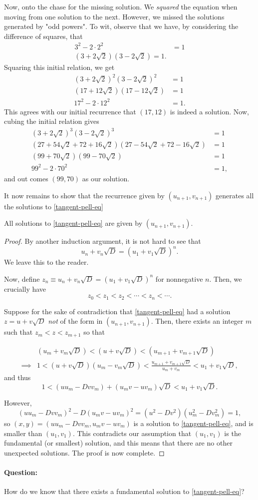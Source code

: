 \documentclass[../jarvis.tex]{subfiles}
\begin{document}
Now, onto the chase for the missing solution. We \textit{squared} the equation when moving from one solution to the next. However, we missed the solutions generated by "odd powers". To wit, observe that we have, by considering the difference of squares, that
\begin{align*}
    3^2-2\cdot2^2&=1 \\
    (3+2\sqrt{2})(3-2\sqrt{2})=1. 
\end{align*}
Squaring this initial relation, we get
\begin{align*}
    (3+2\sqrt{2})^2(3-2\sqrt{2})^2&=1 \\
    (17+12\sqrt{2})(17-12\sqrt{2})&=1 \\
    17^2-2\cdot12^2&=1.
\end{align*}
This agrees with our initial recurrence that $(17,12)$ is indeed a solution. Now, cubing the initial relation gives
\begin{align*}
    (3+2\sqrt{2})^3(3-2\sqrt{2})^3&=1 \\
    (27+54\sqrt{2}+72+16\sqrt{2})(27-54\sqrt{2}+72-16\sqrt{2})&=1 \\
    (99+70\sqrt{2})(99-70\sqrt{2})&=1\\
    99^2-2\cdot70^2&=1,
\end{align*}
and out comes $(99,70)$ as our solution.

It now remains to show that the recurrence given by $(u_{n+1},v_{n+1})$ generates all the solutions to \eqref{tangent-pell-eq}
\begin{lemma}
    All solutions to \eqref{tangent-pell-eq} are given by $(u_{n+1},v_{n+1})$.
\end{lemma}
\begin{proof}
    By another induction argument, it is not hard to see that 
    $$u_n+v_n\sqrt{D}=(u_1+v_1\sqrt{D})^n.$$
    We leave this to the reader.
    
    Now, define $z_n\equiv u_n+v_n\sqrt{D}=(u_1+v_1\sqrt{D})^n$ for nonnegative $n$. Then, we crucially have
    $$z_0<z_1<z_2<\cdots<z_n<\cdots.$$
    
    Suppose for the sake of contradiction that \eqref{tangent-pell-eq} had a solution $z=u+v\sqrt{D}$ \textit{not} of the form in $(u_{n+1},v_{n+1})$. Then, there exists an integer $m$ such that $z_m<z<z_{m+1}$ so that
    
    \begin{align*}
        &(u_m+v_m\sqrt{D})<(u+v\sqrt{D})<(u_{m+1}+v_{m+1}\sqrt{D}) \\
        \implies& 1<(u+v\sqrt{D})(u_m-v_m\sqrt{D})<\frac{u_{m+1}+v_{m+1}\sqrt{D}}{u_m+v_m}<u_1+v_1\sqrt{D},
    \end{align*}
    and thus
    $$1<(uu_m-Dvv_m)+(u_mv-uv_m)\sqrt{D}<u_1+v_1\sqrt{D}.$$
    
    However,
    $$(uu_m-Dvv_m)^2-D(u_mv-uv_m)^2=(u^2-Dv^2)(u_m^2-Dv_m^2)=1,$$
    so $(x,y)=(uu_m-Dvv_m,u_mv-uv_m)$ is a solution to \eqref{tangent-pell-eq}, and is smaller than $(u_1,v_1)$. This contradicts our assumption that $(u_1,v_1)$ is the fundamental (or smallest) solution, and this means that there are no other unexpected solutions. The proof is now complete.
\end{proof}
\paragraph{Question:} How do we know that there exists a fundamental solution to \eqref{tangent-pell-eq}?
\end{document}
